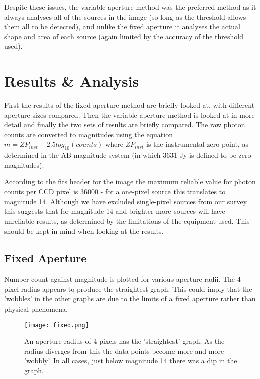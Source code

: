 \documentclass[a4paper,11pt,twoside]{article}
\begin{document}
Despite these issues, the variable aperture method was the preferred 
method as it always analyses all of the sources in the image (so 
long as the threshold allows them all to be detected), and unlike 
the fixed aperture it analyses the actual shape and area of each 
source (again limited by the accuracy of the threshold used).

\section{Results \& Analysis}

First the results of the fixed aperture method are briefly looked at, 
with different aperture sizes compared. Then the variable aperture 
method is looked at in more detail and finally the two sets of 
results are briefly compared.
The raw photon counts are converted to magnitudes using 
the equation \(m = ZP_{inst} - 2.5log_{10}(counts)\) 
where \(ZP_{inst}\) is the instrumental zero point, as determined 
in the AB magnitude system (in which 3631 Jy is defined to be 
zero magnitudes). 

According to the fits header for the image 
the maximum reliable value for photon counts per CCD pixel is 
36000 - for a one-pixel source this translates to magnitude 
14. Although we have excluded single-pixel sources from our survey 
this suggests that for magnitude 14 and brighter more sources 
will have unreliable results, as determined by the limitations 
of the equipment used. This should be kept in mind when looking 
at the results.

\subsection{Fixed Aperture}

Number count against magnitude is plotted for various aperture 
radii. The 4-pixel radius appears to produce the straightest 
graph. This could imply that the 'wobbles' in the other graphs 
are due to the limits of a fixed aperture rather than physical phenomena. 

\begin{figure}[htb]
  \centering
  \texttt{[image: fixed.png]}
  \caption{An aperture radius of 4 pixels has the 'straightest' graph. 
As the radius diverges from this the data points become more and 
more 'wobbly'. In all cases, just below magnitude 14 there was a 
dip in the graph.} 
  \label{fig:fixed}
\end{figure}
\end{document}
